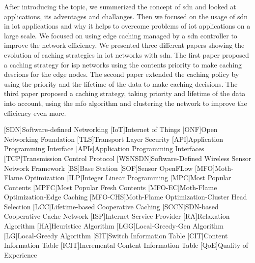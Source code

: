 \documentclass[conference]{IEEEtran}
\begin{document}
	After introducing the topic, we summerized the concept of \ac{sdn} and looked at applications, its adventages and challanges. Then we focused on the usage of \ac{sdn} in \ac{iot} applications and why it helps to overcome problems of \ac{iot} applications on a large scale. We focused on using edge caching managed by a \ac{sdn} controller to improve the network efficiency. We presented three different papers showing the evolution of caching strategies in \ac{iot} networks with \ac{sdn}. The first paper \cite{caching-7} proposed a caching strategy for \ac{isp} networks using the contents priority to make caching descions for the edge nodes. The second paper \cite{caching-2} extended the caching policy by using the priority and the lifetime of the data to make caching decisions. The third paper \cite{caching-1} proposed a caching strategy, taking priority and lifetime of the data into account, using the \ac{mfo} algorithm and clustering the network to improve the efficiency even more.

	\printbibliography
	\begin{acronym}
		[SDN]{Software-defined Networking}
		[IoT]{Internet of Things}
		[ONF]{Open Networking Foundation}
		[TLS]{Transport Layer Security}
		[API]{Application Programming Interface}
		{Application Programming Interfaces}
		[TCP]{Transmission Control Protocol}
		[WSNSDN]{Software-Defined Wireless Sensor Network Framework }
		[BS]{Base Station}
		[SOF]{Sensor OpenFLow}
		[MFO]{Moth-Flame Optimization}
		[ILP]{Integer Linear Programming}
		[MPC]{Most Popular Contents}
		{Most Popular Fresh Contents}
		[MFO-EC]{Moth-Flame Optimization-Edge Caching}
		[MFO-CHS]{Moth-Flame Optimization-Cluster Head Selection}
		[LCC]{Lifetime-based Cooperative Caching}
		{SDN-based Cooperative Cache Network}
		[ISP]{Internet Service Provider}
		[RA]{Relaxation Algorithm}
		[HA]{Heuristice Algorithm}
		[LGG]{Local-Greedy-Gen Algorithm}
		[LG]{Local-Greedy Algorithm}
		[SIT]{Switch Information Table}
		[CIT]{Content Information Table}
		{Incremental Content Information Table}
		[QoE]{Quality of Experience}
	\end{acronym}

\end{document}
